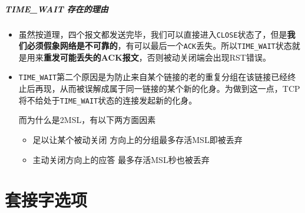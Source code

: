 \documentclass[UTF8,a4paper,12pt]{ctexbook}
\begin{document}
				\subparagraph{TIME\_WAIT 存在的理由}
					\begin{itemize}
						\item  虽然按道理，四个报文都发送完毕，我们可以直接进入\verb|CLOSE|状态了，但是\textbf{我们必须假象网络是不可靠的}，有可以最后一个\verb|ACK|丢失。所以\verb|TIME_WAIT|状态就是用来\textbf{重发可能丢失的ACK报文}，否则被动关闭端会出现RST错误。
						
						\item \verb|TIME_WAIT|第二个原因是为防止来自某个链接的老的重复分组在该链接已经终止后再现，从而被误解成属于同一链接的某个新的化身。为做到这一点，TCP将不给处于\verb|TIME_WAIT|状态的连接发起新的化身。
							
							而为什么是2MSL，有以下两方面因素
							\begin{itemize}
								\item 足以让某个被动关闭 方向上的分组最多存活MSL即被丢弃
								\item 主动关闭方向上的应答 最多存活MSL秒也被丢弃
							\end{itemize}
						
					\end{itemize}
	\section{套接字选项}
\end{document}

